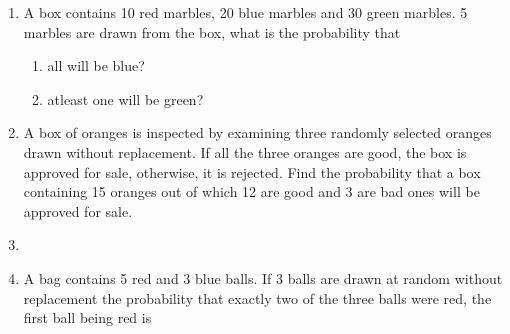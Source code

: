 \begin{enumerate}[label=\thesection.\arabic*,ref=\thesection.\theenumi]
\item A box contains 10 red marbles, 20 blue marbles and 30 green marbles. 5 marbles
are drawn from the box, what is the probability that
\begin{enumerate}
\item all will be blue?
\item atleast one will be green?
\end{enumerate}
\solution

\item A box of oranges is inspected by examining three randomly selected oranges drawn without replacement. If all the three oranges are good, the box is approved for sale, otherwise, it is rejected. Find the probability that a box containing 15 oranges out of which 12 are good and 3 are bad ones will be approved for sale.\\
	\solution

\item 
\item A bag contains 5 red and 3 blue balls. If 3 balls are drawn at random without replacement the probability that exactly two of the three balls were red, the first ball being red is\\

    \end{enumerate}
